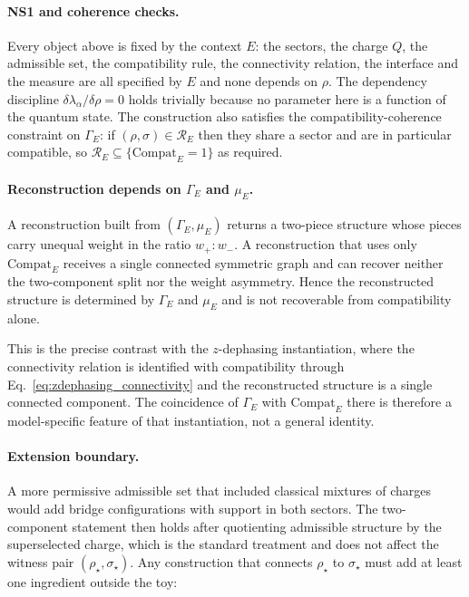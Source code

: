 \documentclass[aps,prx,onecolumn,11pt]{revtex4-2}
\theoremstyle{plain}
\theoremstyle{definition}
\theoremstyle{remark}
\begin{document}
\paragraph{NS1 and coherence checks.}

Every object above is fixed by the context \(E\): the sectors, the
charge \(Q\), the admissible set, the compatibility rule, the
connectivity relation, the interface and the measure are all specified
by \(E\) and none depends on \(\rho\). The dependency discipline
\(\delta\lambda_\alpha/\delta\rho=0\) holds trivially because no
parameter here is a function of the quantum state. The construction also
satisfies the compatibility-coherence constraint on \(\Gamma_E\): if
\((\rho,\sigma)\in\mathcal R_E\) then they share a sector and are in
particular compatible, so
\(\mathcal R_E\subseteq\{\mathrm{Compat}_E=1\}\) as required.

\paragraph{Reconstruction depends on \(\Gamma_E\) and \(\mu_E\).}

A reconstruction built from \((\Gamma_E,\mu_E)\) returns a two-piece
structure whose pieces carry unequal weight in the ratio \(w_+:w_-\). A
reconstruction that uses only \(\mathrm{Compat}_E\) receives a single
connected symmetric graph and can recover neither the two-component
split nor the weight asymmetry. Hence the reconstructed structure is
determined by \(\Gamma_E\) and \(\mu_E\) and is not recoverable from
compatibility alone.

This is the precise contrast with the \(z\)-dephasing instantiation,
where the connectivity relation is identified with compatibility through
Eq.~\eqref{eq:zdephasing_connectivity} and the reconstructed structure
is a single connected component. The coincidence of \(\Gamma_E\) with
\(\mathrm{Compat}_E\) there is therefore a model-specific feature of that
instantiation, not a general identity.

\paragraph{Extension boundary.}

A more permissive admissible set that included classical mixtures of
charges would add bridge configurations with support in both sectors.
The two-component statement then holds after quotienting admissible
structure by the superselected charge, which is the standard treatment
and does not affect the witness pair
\((\rho_\star,\sigma_\star)\). Any construction that connects
\(\rho_\star\) to \(\sigma_\star\) must add at least one ingredient
outside the toy:
\end{document}
